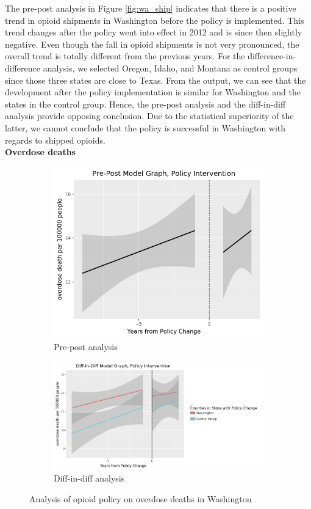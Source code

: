 \documentclass[12pt,letterpaper]{article}
\begin{document}
The pre-post analysis in Figure \ref{fig:wa_ship} indicates that there is a positive trend in opioid shipments in Washington before the policy is implemented. This trend changes after the policy went into effect in 2012 and is since then slightly negative. Even though the fall in opioid shipments is not very pronounced, the overall trend is totally different from the previous years. For the difference-in-difference analysis, we selected Oregon, Idaho, and Montana as control groups since those three states are close to Texas. From the output, we can see that the development after the policy implementation is similar for Washington and the states in the control group. Hence, the pre-post analysis and the diff-in-diff analysis provide opposing conclusion. Due to the statistical superiority of the latter, we cannot conclude that the policy is successful in Washington with regards to shipped opioids. \\

\noindent \textbf{Overdose deaths}

\begin{figure}[!h]
\centering
\begin{subfigure}{.5\textwidth}
  \centering
  \includegraphics[width=0.7\linewidth]{../30_results/General_Results/washington_overdose_death_prepost.png}
  \caption{Pre-post analysis}
  \label{fig:wa_death_prepost}
\end{subfigure}%
\begin{subfigure}{.55\textwidth}
  \centering
  \includegraphics[width=1\linewidth]{../30_results/General_Results/washington_overdose_death_diffdiff.png}
  \caption{Diff-in-diff analysis}
  \label{fig:wa_death_did}
\end{subfigure}
\caption{Analysis of opioid policy on overdose deaths in Washington}
\label{fig:wa_death}
\end{figure}
\end{document}
